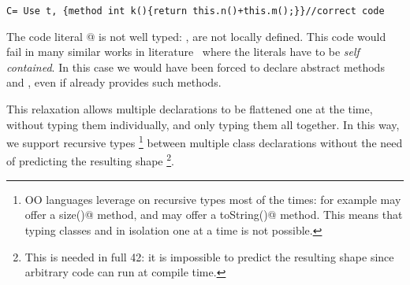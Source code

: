\begin{lstlisting}
C= Use t, {method int k(){return this.n()+this.m();}}//correct code
\end{lstlisting}

\noindent The code literal
@
is not well typed: \Q@n@, \Q@m@ are not locally defined.
This code would fail in many similar works in literature~\cite{deep,Bettini2015282,Bergel2007} where the
literals have to be \emph{self contained}. In this case we would have been forced to
declare abstract methods \Q@n@ and \Q@m@, even if \Q@t@ already 
provides such methods.

This relaxation allows multiple declarations to be flattened one at the time, without typing them individually, and only typing them all together.
In this way, we support recursive types%
\footnote{
OO languages leverage on recursive types most of the times:
for example \Q@String@ may offer a \Q@Int size()@
method, and \Q@Int@ may offer a \Q@String toString()@ method.
This means that typing classes 
\Q@String@ and \Q@Int@ in isolation one at a time is not possible.}
between multiple class declarations without
the need of predicting the resulting shape%
\footnote{This is needed in full 42: it is
impossible to predict the resulting shape since
arbitrary code can run at compile time.}.

